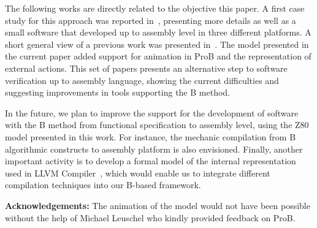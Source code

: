 \documentclass[a4paper]{llncs}
\begin{document}
The following works are directly related to the objective this paper.
A first case study for this approach was reported in~\cite{Dantas_SBMF08}, presenting
more details as well as a small software that developed up to assembly
level in three different platforms. A short general view of a previous work
was presented in~\cite{Valerio_SBMF09}. The model presented in the 
current paper added support for animation in ProB and the representation
of external actions.
This set of papers presents an alternative step to software verification
up to assembly language, showing the current difficulties and
suggesting improvements in tools supporting the B method.

In the future, we plan to improve the support for the development of
software with the B method from functional specification to assembly
level, using the Z80 model presented in this work. For instance, the
mechanic compilation from B algorithmic constructs to assembly
platform is also envisioned. Finally, another important activity is to
develop a formal model of the internal representation used in LLVM
Compiler~\cite{DBLP:conf/cgo/LattnerA04}, which would enable us to
integrate different compilation techniques into our B-based framework.


\textbf{Acknowledgements:} The animation of the model would not
have been possible without the help of Michael Leuschel who kindly
provided feedback on ProB.%



\end{document}
